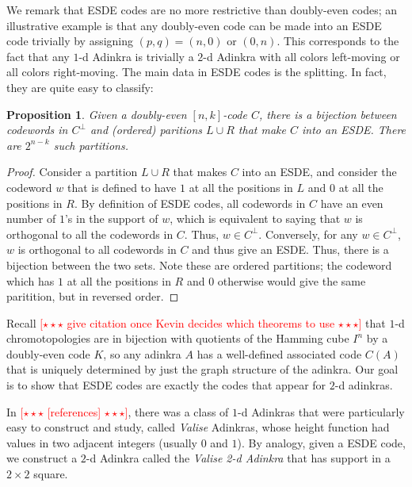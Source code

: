 \documentclass[12pt,twoside,singlespace]{article}
\numberwithin{equation}{section}
\newtheorem{prop}[equation]{Proposition}
\theoremstyle{definition}
\newcommand{\com}[1]{\textcolor{red}{$[\star \star \star$ #1 $\star \star \star]$}}
\begin{document}
We remark that ESDE codes are no more restrictive than doubly-even codes; an illustrative example is that any doubly-even code can be made into an ESDE code trivially by assigning $(p,q) = (n, 0)$ or $(0, n)$. This corresponds to the fact that any $1$-d Adinkra is trivially a $2$-d Adinkra with all colors left-moving or all colors right-moving. The main data in ESDE codes is the splitting. In fact, they are quite easy to classify:

\begin{prop}
\label{prop:esde}
Given a doubly-even $[n,k]$-code $C$, there is a bijection between codewords in $C^\perp$ and (ordered) paritions $L \cup R$ that make $C$ into an ESDE. There are $2^{n-k}$ such partitions. 
\end{prop}

\begin{proof}
Consider a partition $L \cup R$ that makes $C$ into an ESDE, and consider the codeword $w$ that is defined to have $1$ at all the positions in $L$ and $0$ at all the positions in $R$. By definition of ESDE codes, all codewords in $C$ have an even number of $1$'s in the support of $w$, which is equivalent to saying that $w$ is orthogonal to all the codewords in $C$. Thus, $w \in C^\perp$. Conversely, for any $w \in C^\perp$, $w$ is orthogonal to all codewords in $C$ and thus give an ESDE. Thus, there is a bijection between the two sets. Note these are ordered partitions; the codeword which has $1$ at all the positions in $R$ and $0$ otherwise would give the same paritition, but in reversed order.
\end{proof}


Recall \com{give citation once Kevin decides which theorems to use} that $1$-d chromotopologies are in bijection with quotients of the Hamming cube $I^n$ by a doubly-even code $K$, so any adinkra $A$ has a well-defined associated code $C(A)$ that is uniquely determined by just the graph structure of the adinkra. Our goal is to show that ESDE codes are exactly the codes that appear for $2$-d adinkras.

In \com{[references]}, there was a class of $1$-d Adinkras that were particularly easy to construct and study, called {\em Valise} Adinkras, whose height function had values in two adjacent integers (usually $0$ and $1$).  By analogy, given a ESDE code, we construct a $2$-d Adinkra called the {\em Valise 2-d Adinkra} that has support in a $2\times 2$ square.
\end{document}
